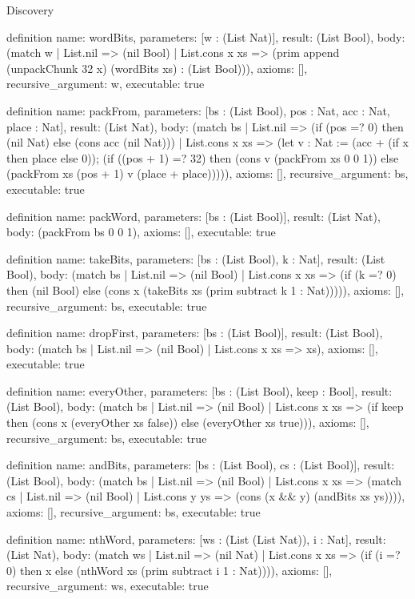 \begin{lexlean}{Discovery}
\begin{semanticmodule}
definition{
  name: wordBits,
  parameters: [w : (List Nat)],
  result: (List Bool),
  body: (match w
    | List.nil => (nil Bool)
    | List.cons x xs => (prim append (unpackChunk 32 x) (wordBits xs) : (List Bool))),
  axioms: [],
  recursive_argument: w,
  executable: true
}

definition{
  name: packFrom,
  parameters: [bs : (List Bool), pos : Nat, acc : Nat, place : Nat],
  result: (List Nat),
  body: (match bs
    | List.nil => (if (pos =? 0) then (nil Nat) else (cons acc (nil Nat)))
    | List.cons x xs => (let v : Nat := (acc + (if x then place else 0)); (if ((pos + 1) =? 32) then (cons v (packFrom xs 0 0 1)) else (packFrom xs (pos + 1) v (place + place))))),
  axioms: [],
  recursive_argument: bs,
  executable: true
}

definition{
  name: packWord,
  parameters: [bs : (List Bool)],
  result: (List Nat),
  body: (packFrom bs 0 0 1),
  axioms: [],
  executable: true
}

definition{
  name: takeBits,
  parameters: [bs : (List Bool), k : Nat],
  result: (List Bool),
  body: (match bs
    | List.nil => (nil Bool)
    | List.cons x xs => (if (k =? 0) then (nil Bool) else (cons x (takeBits xs (prim subtract k 1 : Nat))))),
  axioms: [],
  recursive_argument: bs,
  executable: true
}

definition{
  name: dropFirst,
  parameters: [bs : (List Bool)],
  result: (List Bool),
  body: (match bs
    | List.nil => (nil Bool)
    | List.cons x xs => xs),
  axioms: [],
  executable: true
}

definition{
  name: everyOther,
  parameters: [bs : (List Bool), keep : Bool],
  result: (List Bool),
  body: (match bs
    | List.nil => (nil Bool)
    | List.cons x xs => (if keep then (cons x (everyOther xs false)) else (everyOther xs true))),
  axioms: [],
  recursive_argument: bs,
  executable: true
}

definition{
  name: andBits,
  parameters: [bs : (List Bool), cs : (List Bool)],
  result: (List Bool),
  body: (match bs
    | List.nil => (nil Bool)
    | List.cons x xs => (match cs
    | List.nil => (nil Bool)
    | List.cons y ys => (cons (x && y) (andBits xs ys)))),
  axioms: [],
  recursive_argument: bs,
  executable: true
}

definition{
  name: nthWord,
  parameters: [ws : (List (List Nat)), i : Nat],
  result: (List Nat),
  body: (match ws
    | List.nil => (nil Nat)
    | List.cons x xs => (if (i =? 0) then x else (nthWord xs (prim subtract i 1 : Nat)))),
  axioms: [],
  recursive_argument: ws,
  executable: true
}


\end{semanticmodule}
\end{lexlean}

